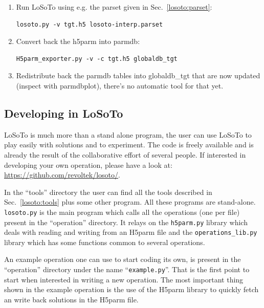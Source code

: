 \documentclass[]{article}
\def \losoto {LoSoTo}
\begin{document}
\begin{enumerate}
\item Run LoSoTo using e.g. the parset given in Sec.~\ref{losoto:parset}:
\begin{verbatim}
losoto.py -v tgt.h5 losoto-interp.parset
\end{verbatim}

\item Convert back the h5parm into parmdb:
\begin{verbatim}
H5parm_exporter.py -v -c tgt.h5 globaldb_tgt
\end{verbatim}

\item Redistribute back the parmdb tables into globaldb\_tgt that are now updated (inspect with parmdbplot), there's no automatic tool for that yet.
\end{enumerate}

\subsection{Developing in LoSoTo}
\label{losoto:developing}
\losoto{} is much more than a stand alone program, the user can use \losoto{} to play easily with solutions and to experiment. The code is freely available and is already the result of the collaborative effort of several people. If interested in developing your own operation, please have a look at: \url{https://github.com/revoltek/losoto/}.

In the ``tools'' directory the user can find all the tools described in Sec.~\ref{losoto:tools} plus some other program. All these programs are stand-alone. \texttt{losoto.py} is the main program which calls all the operations (one per file) present in the ``operation'' directory. It relays on the \texttt{h5parm.py} library which deals with reading and writing from an H5parm file and the \texttt{operations\_lib.py} library which has some functions common to several operations.

An example operation one can use to start coding its own, is present in the ``operation'' directory under the name ``\texttt{example.py}''. That is the first point to start when interested in writing a new operation. The most important thing shown in the example operation is the use of the H5parm library to quickly fetch an write back solutions in the H5parm file.
\end{document}
